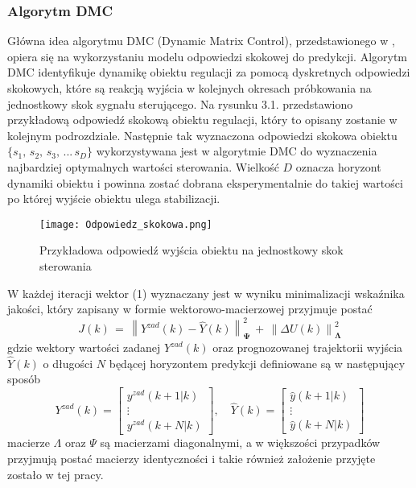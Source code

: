 \subsubsection{Algorytm DMC}
Główna idea algorytmu DMC (Dynamic Matrix Control), przedstawionego w \cite{dmc1979}, opiera się na wykorzystaniu modelu odpowiedzi skokowej do predykcji. Algorytm DMC identyfikuje dynamikę obiektu regulacji za pomocą dyskretnych odpowiedzi skokowych, które są reakcją wyjścia w kolejnych okresach próbkowania na jednostkowy skok sygnału sterującego. Na rysunku 3.1. przedstawiono przykładową odpowiedź skokową obiektu regulacji, który to opisany zostanie w kolejnym podrozdziale. Następnie tak wyznaczona odpowiedzi skokowa obiektu \(\{s_1,\, s_2,\, s_3,\, ...\, s_D \}\) wykorzystywana jest w algorytmie DMC do wyznaczenia najbardziej optymalnych wartości sterowania. Wielkość \(D\) oznacza horyzont dynamiki obiektu i powinna zostać dobrana eksperymentalnie do takiej wartości po której wyjście obiektu ulega stabilizacji. 
\begin{figure}[!h]
    \label{fig:Odpowiedz-skokowa}
    \centering \texttt{[image: Odpowiedz\_skokowa.png]}
    \caption{Przykładowa odpowiedź wyjścia obiektu na jednostkowy skok sterowania}
\end{figure}
\par W każdej iteracji wektor (1) wyznaczany jest w wyniku minimalizacji wskaźnika jakości, który zapisany w formie wektorowo-macierzowej przyjmuje postać
\begin{equation}
J(k) \, = \, \left\| Y^{zad}(k) - \hat{Y}(k) \right\|_{\bm{\Psi}}^2 \,+ \,\left\| \Delta U(k) \right\|_{\bm{\Lambda}}^2
\end{equation}
gdzie wektory wartości zadanej \( Y^{zad}(k) \) oraz prognozowanej trajektorii wyjścia \( \hat{Y}(k) \) o długości \( N \) będącej horyzontem predykcji definiowane są w następujący sposób
\begin{equation}
Y^{zad}(k) =
	 \begin{bmatrix}
		y^{zad}(k+1|k) \\
		\vdots \\
		y^{zad}(k+N|k)
	\end{bmatrix} , \quad
\hat{Y}(k) = 
	\begin{bmatrix}
		\hat{y}(k+1|k) \\
		\vdots \\
		\hat{y}(k+N|k)
	\end{bmatrix}
\end{equation}
macierze \( \Lambda\) oraz \( \Psi\) są macierzami diagonalnymi, a w większości przypadków przyjmują postać macierzy identyczności i takie również założenie przyjęte zostało w tej pracy. 
